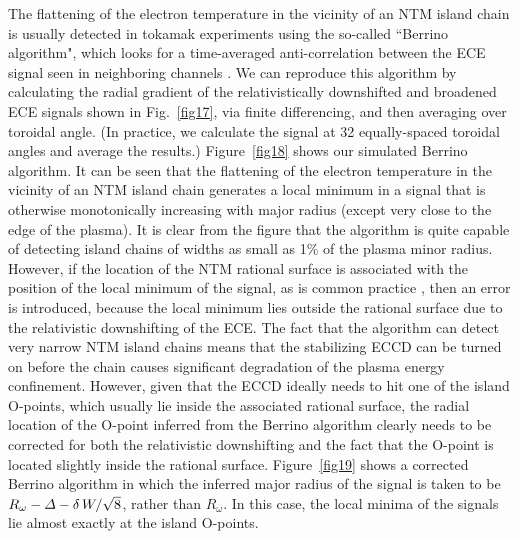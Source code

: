 \documentclass{iopjournal}
\begin{document}
The flattening of the electron temperature in the vicinity of an NTM island chain is usually detected in tokamak experiments using the so-called ``Berrino algorithm", which looks for
a time-averaged anti-correlation between the ECE signal seen in neighboring channels \cite{ece4}. We can  reproduce this algorithm  by calculating the radial gradient of
the relativistically downshifted and broadened ECE signals shown in Fig.~\ref{fig17}, via finite differencing,  and then averaging over toroidal angle. (In practice, we
calculate the signal at 32 equally-spaced toroidal angles and average the results.) Figure~\ref{fig18} shows our simulated Berrino algorithm. It can be seen that the
flattening of the electron temperature in the vicinity of an NTM island chain generates a local minimum in a signal that is otherwise monotonically increasing with major radius (except very close to
the edge of the plasma). It is clear from the figure that the algorithm is quite capable of detecting island chains of widths as small as 1\% of the plasma minor radius. 
However, if the location of the NTM rational surface is associated with the position of the local minimum of the signal, as is common practice \cite{ece4},  then an error is introduced, because the
local minimum lies outside the rational surface due to the relativistic downshifting of the ECE. The fact that the algorithm can detect very narrow NTM island chains means that the stabilizing ECCD can be turned on before the chain causes significant
degradation of the plasma energy confinement. However, given that the ECCD ideally needs to hit one of the island O-points, which usually lie inside the associated rational 
surface, the radial location of the O-point inferred from the Berrino algorithm clearly needs to be corrected for both the relativistic downshifting and the fact that the O-point
is located slightly inside the rational surface. Figure~\ref{fig19} shows a corrected Berrino algorithm  in which the inferred major
radius of the signal is taken to be $R_\omega-{\mit\Delta}-\delta\,W/\sqrt{8}$, rather than $R_\omega$. In this case, the  local minima of the signals lie almost exactly
at the island O-points. 
 
\end{document}
